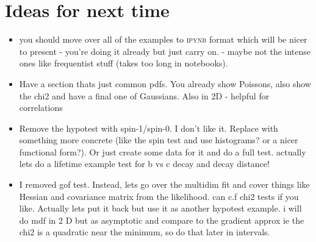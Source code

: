 \section{Ideas for next time}

\begin{itemize}
\item you should move over all of the examples to \textsc{ipynb} format which will be nicer to present - you're doing it already but just carry on. - maybe not the intense ones like frequentist stuff (takes too long in notebooks).

\item Have a section thats just common pdfs. You already show Poissons, also show the chi2 and have a final one of Gaussians. Also in 2D - helpful for correlations 

\item Remove the hypotest with spin-1/spin-0. I don't like it. Replace with something more concrete (like the spin test and use histograms? or a nicer functional form?). Or just create some data for it and do a full test. actually lets do a lifetime example test for b vs c decay and decay distance!

\item I removed gof test. Instead, lets go over the multidim fit and cover things like Hessian and covariance matrix from the likelihood. can c.f chi2 tests if you like. 
Actually lets put it back but use it as another  hypotest example. i will do mdf in 2 D but as asymptotic and compare to the gradient approx ie the chi2 is a quadratic near the minimum, so do that later in intervals.
\end{itemize}

